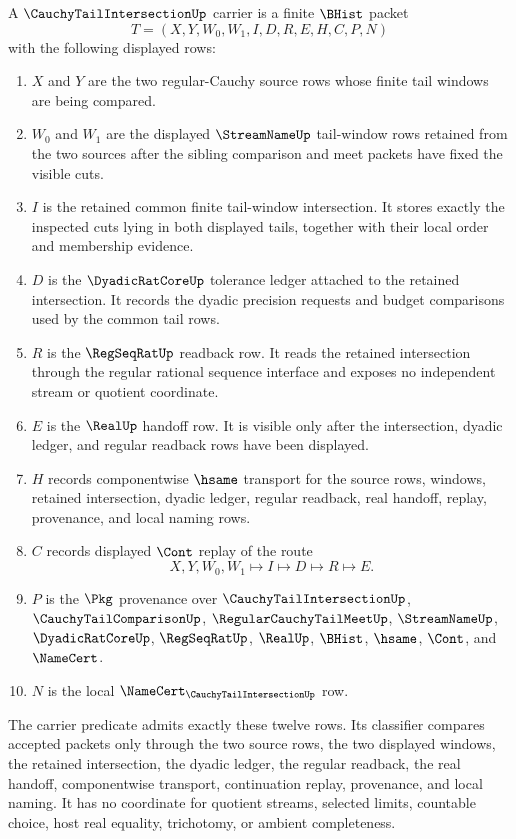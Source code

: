 \begin{definition}
\label{def:cauchy-tail-intersection-carrier}
A $\CauchyTailIntersectionUp$ carrier is a finite $\BHist$ packet
$$
T=(X,Y,W_0,W_1,I,D,R,E,H,C,P,N)
$$
with the following displayed rows:
\begin{enumerate}
\item $X$ and $Y$ are the two regular-Cauchy source rows whose finite tail windows are being compared.
\item $W_0$ and $W_1$ are the displayed $\StreamNameUp$ tail-window rows retained from the two sources after the sibling comparison and meet packets have fixed the visible cuts.
\item $I$ is the retained common finite tail-window intersection. It stores exactly the inspected cuts lying in both displayed tails, together with their local order and membership evidence.
\item $D$ is the $\DyadicRatCoreUp$ tolerance ledger attached to the retained intersection. It records the dyadic precision requests and budget comparisons used by the common tail rows.
\item $R$ is the $\RegSeqRatUp$ readback row. It reads the retained intersection through the regular rational sequence interface and exposes no independent stream or quotient coordinate.
\item $E$ is the $\RealUp$ handoff row. It is visible only after the intersection, dyadic ledger, and regular readback rows have been displayed.
\item $H$ records componentwise $\hsame$ transport for the source rows, windows, retained intersection, dyadic ledger, regular readback, real handoff, replay, provenance, and local naming rows.
\item $C$ records displayed $\Cont$ replay of the route
$$
X,Y,W_0,W_1 \longmapsto I \longmapsto D \longmapsto R \longmapsto E .
$$
\item $P$ is the $\Pkg$ provenance over $\CauchyTailIntersectionUp$, $\CauchyTailComparisonUp$, $\RegularCauchyTailMeetUp$, $\StreamNameUp$, $\DyadicRatCoreUp$, $\RegSeqRatUp$, $\RealUp$, $\BHist$, $\hsame$, $\Cont$, and $\NameCert$.
\item $N$ is the local $\NameCert_{\CauchyTailIntersectionUp}$ row.
\end{enumerate}
The carrier predicate admits exactly these twelve rows. Its classifier compares accepted packets only through the two source rows, the two displayed windows, the retained intersection, the dyadic ledger, the regular readback, the real handoff, componentwise transport, continuation replay, provenance, and local naming. It has no coordinate for quotient streams, selected limits, countable choice, host real equality, trichotomy, or ambient completeness.
\end{definition}

